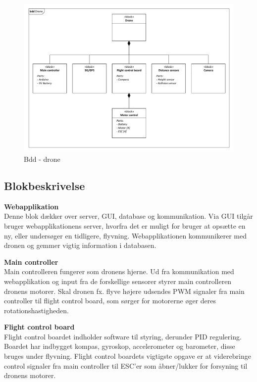 \begin{figure}[H]
\centering
\includegraphics[width=1\textwidth]{Billeder/BDD/bdd_drone.pdf}
\caption{Bdd - drone}
\label{fig:bdd_drone}
\end{figure}

\newpage

\subsection{Blokbeskrivelse}

\textbf{Webapplikation}\\
Denne blok dækker over server, GUI, database og kommunikation. Via GUI tilgår bruger webapplikationens server, hvorfra det er muligt for bruger at opsætte en ny, eller undersøger en tidligere, flyvning. Webapplikationen kommunikerer med dronen og gemmer vigtig information i databasen.

\textbf{Main controller}\\
Main controlleren fungerer som dronens hjerne. Ud fra kommunikation med webapplikation og input fra de forskellige sensorer styrer main controlleren dronens motorer. Skal dronen fx. flyve højere udsendes PWM signaler fra main controller til flight control board, som sørger for motorerne øger deres rotationshastigheden. 

\textbf{Flight control board}\\
Flight control boardet indholder software til styring, derunder PID regulering. Boardet har indbygget kompas, gyroskop, accelerometer og barometer, disse bruges under flyvning. Flight control boardets vigtigste opgave er at viderebringe control signaler fra main controller til ESC'er som åbner/lukker for forsyning til dronens motorer. 

